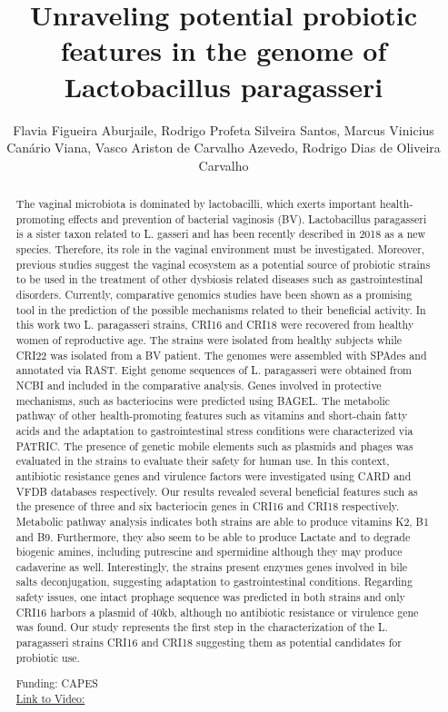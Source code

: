 \documentclass[twoside]{article}
\title{\vspace{-15mm}\fontsize{24pt}{10pt}\selectfont\textbf{ Unraveling potential probiotic features in the genome of Lactobacillus paragasseri }} %
\author{ Flavia Figueira Aburjaile,  Rodrigo Profeta Silveira Santos,  Marcus Vinicius Can\'ario Viana,  Vasco Ariston de Carvalho Azevedo,  Rodrigo Dias de Oliveira Carvalho }
\affil{ IOC/Fiocruz,  UNIVERSIDADE FEDERAL DE MINAS GERAIS }
\date{}
\begin{document}
  
  
  \maketitle %
  
  
  \thispagestyle{fancy} %
  
  
  \begin{abstract}
  The vaginal microbiota is dominated by lactobacilli,  which exerts important health-promoting effects and prevention of bacterial vaginosis (BV). Lactobacillus paragasseri is a sister taxon related to L. gasseri and has been recently described in 2018 as a new species. Therefore,  its role in the vaginal environment must be investigated. Moreover,  previous studies suggest the vaginal ecosystem as a potential source of probiotic strains to be used in the treatment of other dysbiosis related diseases such as gastrointestinal disorders. Currently,  comparative genomics studies have been shown as a promising tool in the prediction of the possible mechanisms related to their beneficial activity. In this work two L. paragasseri strains,  CRI16 and CRI18 were recovered from healthy women of reproductive age. The strains were isolated from healthy subjects while CRI22 was isolated from a BV patient. The genomes were assembled with SPAdes and annotated via RAST. Eight genome sequences of L. paragasseri were obtained from NCBI and included in the comparative analysis. Genes involved in protective mechanisms,  such as bacteriocins were predicted using BAGEL. The metabolic pathway of other health-promoting features such as vitamins and short-chain fatty acids and the adaptation to gastrointestinal stress conditions were characterized via PATRIC. The presence of genetic mobile elements such as plasmids and phages was evaluated in the strains to evaluate their safety for human use. In this context,  antibiotic resistance genes and virulence factors were investigated using CARD and VFDB databases respectively. Our results revealed several beneficial features such as the presence of three and six bacteriocin genes in CRI16 and CRI18 respectively. Metabolic pathway analysis indicates both strains are able to produce vitamins K2,   B1 and B9. Furthermore,  they also seem to be able to produce Lactate and to degrade biogenic amines,  including putrescine and spermidine although they may produce cadaverine as well. Interestingly,  the strains present enzymes genes involved in bile salts deconjugation,  suggesting adaptation to gastrointestinal conditions. Regarding safety issues,  one intact prophage sequence was predicted in both strains and only CRI16 harbors a plasmid of 40kb,  although no antibiotic resistance or virulence gene was found. Our study represents the first step in the characterization of the L. paragasseri strains CRI16 and CRI18 suggesting them as potential candidates for probiotic use.
  
  Funding: CAPES \\
  \href{http://ab3c.org.br/xpress_pres2020/xmxp2020-305812.html}{Link to Video:}

  \end{abstract}
   
  
\end{document}
